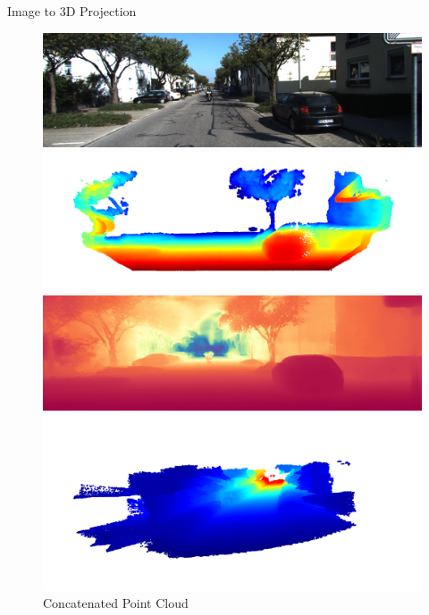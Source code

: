 \begin{frame}{Image to 3D Projection}
\begin{figure}
    \centering
    \begin{minipage}{0.49\textwidth}
        \centering
        \includegraphics[width=\textwidth]{figures/rgb_image.png}
        \caption{Sample RGB Image}
        \includegraphics[width=\textwidth]{figures/projected_point_cloud.png}
        \caption{Projected Point Cloud}
    \end{minipage}
    \hfill
    \begin{minipage}{0.49\textwidth}
        \centering
        \includegraphics[width=\textwidth]{figures/depth_estimate.png}
        \caption{Estimated Depth}
        \includegraphics[width=\textwidth]{figures/concatenated_point_cloud.png}
        \caption{Concatenated Point Cloud}
    \end{minipage}
\end{figure}
\end{frame}
